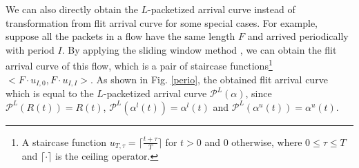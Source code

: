 \documentclass[preprint]{elsarticle}
\begin{document}
We can also directly obtain the $L$-packetized arrival curve instead of transformation from flit arrival curve for some special cases. For example, suppose all the packets in a flow have the same length $F$ and arrived periodically with period $I$. By applying the sliding window method \cite{1253607}, we can obtain the flit arrival curve of this flow, which is a pair of staircase functions\footnote{A staircase function $u_{T,\tau}=\lceil\frac{t+\tau}{T}\rceil$ for $t>0$ and 0 otherwise, where $0\leq \tau\leq T$ and $\lceil\cdot\rceil$ is the ceiling operator.} $<F\cdot u_{I,0},F\cdot u_{I,I}>$. As shown in Fig. \ref{perio}, the obtained flit arrival curve which is equal to the $L$-packetized arrival curve $\mathcal{P}^L(\alpha)$, since $\mathcal{P}^L(R(t))=R(t)$, $\mathcal{P}^L(\alpha^l(t))=\alpha^l(t)$ and $\mathcal{P}^L(\alpha^u(t))=\alpha^u(t)$.
\begin{figure}
  \centering
  \hspace{10pt}

\end{figure}
\end{document}
